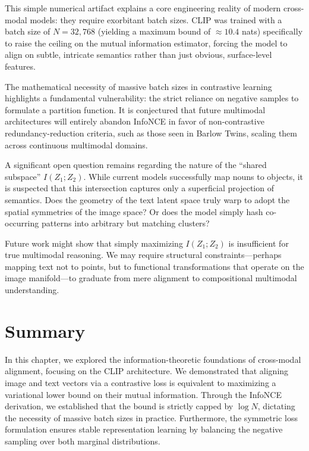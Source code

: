 This simple numerical artifact explains a core engineering reality of modern cross-modal models: they require exorbitant batch sizes. CLIP was trained with a batch size of $N=32,768$ (yielding a maximum bound of $\approx 10.4$ nats) specifically to raise the ceiling on the mutual information estimator, forcing the model to align on subtle, intricate semantics rather than just obvious, surface-level features.

\begin{horizon}
The mathematical necessity of massive batch sizes in contrastive learning highlights a fundamental vulnerability: the strict reliance on negative samples to formulate a partition function. It is conjectured that future multimodal architectures will entirely abandon InfoNCE in favor of non-contrastive redundancy-reduction criteria, such as those seen in Barlow Twins, scaling them across continuous multimodal domains.

A significant open question remains regarding the nature of the ``shared subspace'' $I(Z_1; Z_2)$. While current models successfully map nouns to objects, it is suspected that this intersection captures only a superficial projection of semantics. Does the geometry of the text latent space truly warp to adopt the spatial symmetries of the image space? Or does the model simply hash co-occurring patterns into arbitrary but matching clusters? 

Future work might show that simply maximizing $I(Z_1; Z_2)$ is insufficient for true multimodal reasoning. We may require structural constraints—perhaps mapping text not to points, but to functional transformations that operate on the image manifold—to graduate from mere alignment to compositional multimodal understanding.
\end{horizon}

\section{Summary}
In this chapter, we explored the information-theoretic foundations of cross-modal alignment, focusing on the CLIP architecture. We demonstrated that aligning image and text vectors via a contrastive loss is equivalent to maximizing a variational lower bound on their mutual information. Through the InfoNCE derivation, we established that the bound is strictly capped by $\log N$, dictating the necessity of massive batch sizes in practice. Furthermore, the symmetric loss formulation ensures stable representation learning by balancing the negative sampling over both marginal distributions.

